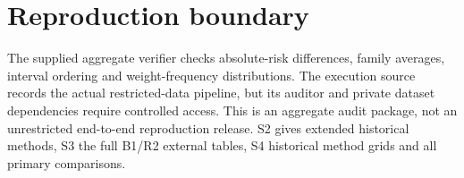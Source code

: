 \documentclass[10pt]{article}
\begin{document}
\section{Reproduction boundary}
The supplied aggregate verifier checks absolute-risk differences, family averages, interval ordering and weight-frequency distributions. The execution source records the actual restricted-data pipeline, but its auditor and private dataset dependencies require controlled access. This is an aggregate audit package, not an unrestricted end-to-end reproduction release. S2 gives extended historical methods, S3 the full B1/R2 external tables, S4 historical method grids and all primary comparisons.
\end{document}
